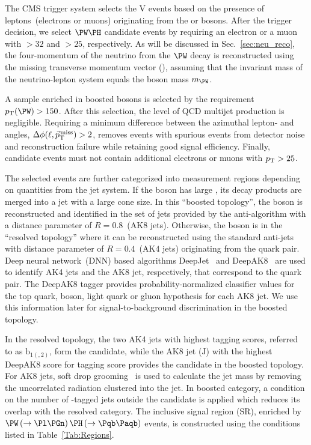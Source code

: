 \documentclass[a4paper,11pt]{article}
\newcommand{\Pb}{{{\Pqb}}\xspace}
\newcommand{\PAb}{{{{\Paqb}}}\xspace}
\renewcommand{\PV}{{{{V}}}\xspace}
\newcommand{\VH}{{{\PV}{\PH}}\xspace}
\begin{document}
The CMS trigger system selects the \VH events based on the presence of leptons~(electrons or muons) originating from the \PW or \PZ bosons.
After the trigger decision, we select $\PW\PH$ candidate events by requiring an electron or a muon with \pt$>32$ and $>25$\GeV, respectively. 
As will be discussed in Sec.~\ref{sec:neu_reco}, the four-momentum of the neutrino from the $\PW$ decay is reconstructed using the missing transverse momentum vector (\ptvecmiss), assuming that the invariant mass of the neutrino-lepton system equals the \PW boson mass $m_{\PW}$.

A sample enriched in boosted \PW bosons is selected by the requirement $\pt(\PW) > 150$\GeV. 
After this selection, the level of QCD multijet production is negligible.
Requiring a minimum difference between the azimuthal lepton- and \ptmiss angles, $\Delta\phi(\ell,{\vec p}_{\mathrm{T}}^{\kern1pt\text{miss}})>2$, removes events with spurious events from detector noise and reconstruction failure while retaining good signal efficiency.
Finally, \PW candidate events must not contain additional electrons or muons with $p_{\mathrm{T}}>25$\GeV.

The selected events are further categorized into measurement regions depending on quantities from the jet system. 
If the \PH boson has large \pt, its decay products are merged into a jet with a large cone size. 
In this ``boosted topology'', the \PH boson is reconstructed and identified in the set of jets provided by the anti-\kt algorithm with a distance parameter of $R=0.8$~(AK8 jets).
Otherwise, the \PH boson is in the ``resolved topology'' where it can be reconstructed using the standard anti-\kt jets with distance parameter of $R=0.4$~(AK$4$ jets) originating from the \Pb quark pair. 
Deep neural network~(DNN) based algorithms DeepJet~\cite{Bols:2020bkb} and DeepAK8~\cite{Sirunyan:2020lcu} are used to identify AK4 jets and the AK8 jet, respectively, that correspond to the \Pb quark pair.
The DeepAK8 tagger provides probability-normalized classifier values for the top quark, \PW boson, light quark or gluon hypothesis for each AK8 jet. We use this information later for signal-to-background discrimination in the boosted topology. %

In the resolved topology, the two AK4 jets with highest \Pb tagging scores, referred to as $\textrm{b}_{1(,2)}$, form the \PH candidate, while the AK8 jet ($\textrm{J}$) with the highest DeepAK8 score for \PH tagging score provides the \PH candidate in the boosted topology.
For AK8 jets, soft drop grooming~\cite{Larkoski:2014wba} is used to calculate the jet mass by removing the uncorrelated radiation clustered into the jet. 
In boosted category, a condition on the number of {\Pb}-tagged jets outside the \PH candidate is applied which reduces its overlap with the resolved category.
The inclusive signal region (SR), enriched by $\PW\left(\rightarrow \Pl \Pgn \right) \PH \left(\rightarrow \Pb \PAb \right)$ events, is constructed using the conditions listed in Table~\ref{Tab:Regions}.
\end{document}
